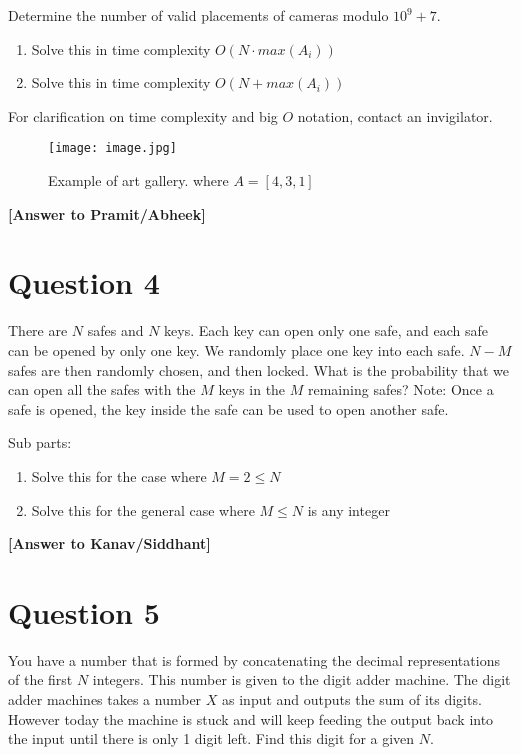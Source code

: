 \documentclass[a4paper,12pt]{article}
\begin{document}
\noindent
Determine the number of valid placements of cameras modulo $10^9 + 7$.
\begin{enumerate}[label=\alph*)]
    \item Solve this in time complexity $O(N \cdot max(A_i))$
    \item Solve this in time complexity $O(N + max(A_i))$
\end{enumerate}
For clarification on time complexity and big $O$ notation, contact an invigilator.

\begin{figure}
    \begin{center}
    \texttt{[image: image.jpg]}

    Example of art gallery. where $A = [4, 3, 1]$
    \end{center}
\end{figure}

\textbf{[Answer to Pramit/Abheek]}

\hrulefill

\section*{Question 4}
There are $N$ safes and $N$ keys. Each key can open only one safe, and each safe can be opened by only one key. We randomly place one key into each safe. $N - M$ safes are then randomly chosen, and then locked. What is the probability that we can open all the safes with the $M$ keys in the $M$ remaining safes? Note: Once a safe is opened, the key inside the safe can be used to open another safe.

\noindent
Sub parts:
\begin{enumerate}[label=\alph*)]
    \item Solve this for the case where $M = 2 \le N$
    \item Solve this for the general case where $M \le N$ is any integer
\end{enumerate}


\textbf{[Answer to Kanav/Siddhant]}

\hrulefill

\section*{Question 5}
You have a number that is formed by concatenating the decimal representations of the first $N$ integers. This number is given to the digit adder machine. The digit adder machines takes a number $X$ as input and outputs the sum of its digits. However today the machine is stuck and will keep feeding the output back into the input until there is only 1 digit left. Find this digit for a given $N$.
\end{document}
